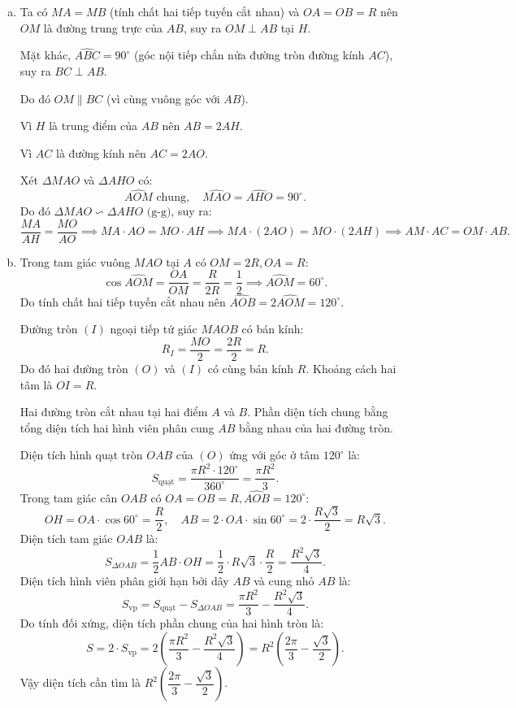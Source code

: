 \begin{bt}
{\begin{enumerate}[a)]
			Tâm $I$ của đường tròn này là trung điểm của đoạn thẳng $MO$.
			\item Ta có $MA = MB$ (tính chất hai tiếp tuyến cắt nhau) và $OA = OB = R$ nên $OM$ là đường trung trực của $AB$, suy ra $OM \perp AB$ tại $H$.
			
			Mặt khác, $\widehat{ABC} = 90^\circ$ (góc nội tiếp chắn nửa đường tròn đường kính $AC$), suy ra $BC \perp AB$.
			
			Do đó $OM \parallel BC$ (vì cùng vuông góc với $AB$).
			
			Vì $H$ là trung điểm của $AB$ nên $AB = 2AH$.
			
			Vì $AC$ là đường kính nên $AC = 2AO$.
			
			Xét $\Delta MAO$ và $\Delta AHO$ có:
			$$\widehat{AOM}\text{ chung},\quad \widehat{MAO} = \widehat{AHO} = 90^\circ.$$
			Do đó $\Delta MAO \backsim \Delta AHO\text{ (g-g)}$, suy ra:
			$$\dfrac{MA}{AH} = \dfrac{MO}{AO} \implies MA \cdot AO = MO \cdot AH \implies MA \cdot (2AO) = MO \cdot (2AH) \implies AM \cdot AC = OM \cdot AB.$$
			\item Trong tam giác vuông $MAO$ tại $A$ có $OM = 2R, OA = R$:
			$$\cos\widehat{AOM} = \dfrac{OA}{OM} = \dfrac{R}{2R} = \dfrac{1}{2} \implies \widehat{AOM} = 60^\circ.$$
			Do tính chất hai tiếp tuyến cắt nhau nên $\widehat{AOB} = 2\widehat{AOM} = 120^\circ$.
			
			Đường tròn $(I)$ ngoại tiếp tứ giác $MAOB$ có bán kính:
			$$R_I = \dfrac{MO}{2} = \dfrac{2R}{2} = R.$$
			Do đó hai đường tròn $(O)$ và $(I)$ có cùng bán kính $R$. Khoảng cách hai tâm là $OI = R$.
			
			Hai đường tròn cắt nhau tại hai điểm $A$ và $B$. Phần diện tích chung bằng tổng diện tích hai hình viên phân cung $AB$ bằng nhau của hai đường tròn.
			
			Diện tích hình quạt tròn $OAB$ của $(O)$ ứng với góc ở tâm $120^\circ$ là:
			$$S_{\text{quạt}} = \dfrac{\pi R^2 \cdot 120^\circ}{360^\circ} = \dfrac{\pi R^2}{3}.$$
			Trong tam giác cân $OAB$ có $OA = OB = R, \widehat{AOB} = 120^\circ$:
			$$OH = OA \cdot \cos 60^\circ = \dfrac{R}{2},\quad AB = 2 \cdot OA \cdot \sin 60^\circ = 2 \cdot \dfrac{R\sqrt{3}}{2} = R\sqrt{3}.$$
			Diện tích tam giác $OAB$ là:
			$$S_{\Delta OAB} = \dfrac{1}{2} AB \cdot OH = \dfrac{1}{2} \cdot R\sqrt{3} \cdot \dfrac{R}{2} = \dfrac{R^2\sqrt{3}}{4}.$$
			Diện tích hình viên phân giới hạn bởi dây $AB$ và cung nhỏ $AB$ là:
			$$S_{\text{vp}} = S_{\text{quạt}} - S_{\Delta OAB} = \dfrac{\pi R^2}{3} - \dfrac{R^2\sqrt{3}}{4}.$$
			Do tính đối xứng, diện tích phần chung của hai hình tròn là:
			$$S = 2 \cdot S_{\text{vp}} = 2\left(\dfrac{\pi R^2}{3} - \dfrac{R^2\sqrt{3}}{4}\right) = R^2\left(\dfrac{2\pi}{3} - \dfrac{\sqrt{3}}{2}\right).$$
			Vậy diện tích cần tìm là $R^2\left(\dfrac{2\pi}{3} - \dfrac{\sqrt{3}}{2}\right)$.
		\end{enumerate}
	}
\end{bt}

